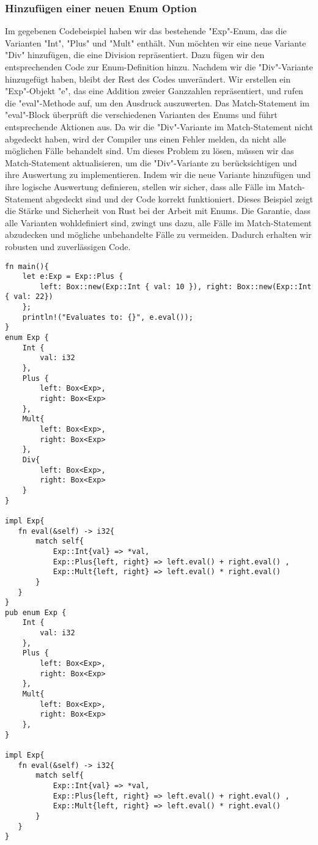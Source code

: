 \documentclass[a4paper, 1ppt]{article}
\begin{document}
\subsubsection{Hinzufügen einer neuen Enum Option}
Im gegebenen Codebeispiel haben wir das bestehende "Exp"-Enum, das die Varianten "Int", "Plus" und "Mult" enthält. Nun möchten wir eine neue Variante "Div" hinzufügen, die eine Division repräsentiert. Dazu fügen wir den entsprechenden Code zur Enum-Definition hinzu.
Nachdem wir die "Div"-Variante hinzugefügt haben, bleibt der Rest des Codes unverändert. Wir erstellen ein "Exp"-Objekt "e", das eine Addition zweier Ganzzahlen repräsentiert, und rufen die "eval"-Methode auf, um den Ausdruck auszuwerten.
Das Match-Statement im "eval"-Block überprüft die verschiedenen Varianten des Enums und führt entsprechende Aktionen aus. Da wir die "Div"-Variante im Match-Statement nicht abgedeckt haben, wird der Compiler uns einen Fehler melden, da nicht alle möglichen Fälle behandelt sind.
Um dieses Problem zu lösen, müssen wir das Match-Statement aktualisieren, um die "Div"-Variante zu berücksichtigen und ihre Auswertung zu implementieren. Indem wir die neue Variante hinzufügen und ihre logische Auswertung definieren, stellen wir sicher, dass alle Fälle im Match-Statement abgedeckt sind und der Code korrekt funktioniert.
Dieses Beispiel zeigt die Stärke und Sicherheit von Rust bei der Arbeit mit Enums. Die Garantie, dass alle Varianten wohldefiniert sind, zwingt uns dazu, alle Fälle im Match-Statement abzudecken und mögliche unbehandelte Fälle zu vermeiden. Dadurch erhalten wir robusten und zuverlässigen Code.
\begin{verbatim}
fn main(){
    let e:Exp = Exp::Plus { 
        left: Box::new(Exp::Int { val: 10 }), right: Box::new(Exp::Int { val: 22})
    };
    println!("Evaluates to: {}", e.eval());
}
enum Exp {
    Int {
        val: i32
    },
    Plus {
        left: Box<Exp>,
        right: Box<Exp>
    },
    Mult{
        left: Box<Exp>,
        right: Box<Exp>
    },
    Div{
        left: Box<Exp>,
        right: Box<Exp>
    }
}

impl Exp{
   fn eval(&self) -> i32{
       match self{
           Exp::Int{val} => *val,
           Exp::Plus{left, right} => left.eval() + right.eval() ,
           Exp::Mult{left, right} => left.eval() * right.eval()
       }
   }
}
pub enum Exp {
    Int {
        val: i32
    },
    Plus {
        left: Box<Exp>,
        right: Box<Exp>
    },
    Mult{
        left: Box<Exp>,
        right: Box<Exp>
    },
}

impl Exp{
   fn eval(&self) -> i32{
       match self{
           Exp::Int{val} => *val,
           Exp::Plus{left, right} => left.eval() + right.eval() ,
           Exp::Mult{left, right} => left.eval() * right.eval()
       }
   }
}
\end{verbatim}
\end{document}
